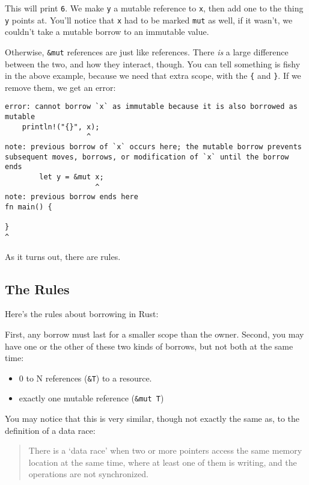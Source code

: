 \documentclass[a4paper,]{book}
\begin{document}
This will print \texttt{6}. We make \texttt{y} a mutable reference to
\texttt{x}, then add one to the thing \texttt{y} points at. You'll
notice that \texttt{x} had to be marked \texttt{mut} as well, if it
wasn't, we couldn't take a mutable borrow to an immutable value.

Otherwise, \texttt{\&mut} references are just like references. There
\emph{is} a large difference between the two, and how they interact,
though. You can tell something is fishy in the above example, because we
need that extra scope, with the \texttt{\{} and \texttt{\}}. If we
remove them, we get an error:

\begin{verbatim}
error: cannot borrow `x` as immutable because it is also borrowed as mutable
    println!("{}", x);
                   ^
note: previous borrow of `x` occurs here; the mutable borrow prevents
subsequent moves, borrows, or modification of `x` until the borrow ends
        let y = &mut x;
                     ^
note: previous borrow ends here
fn main() {

}
^
\end{verbatim}

As it turns out, there are rules.

\subsection{The Rules}\label{the-rules}

Here's the rules about borrowing in Rust:

First, any borrow must last for a smaller scope than the owner. Second,
you may have one or the other of these two kinds of borrows, but not
both at the same time:

\begin{itemize}
\itemsep1pt\parskip0pt
\item
  0 to N references (\texttt{\&T}) to a resource.
\item
  exactly one mutable reference (\texttt{\&mut\ T})
\end{itemize}

You may notice that this is very similar, though not exactly the same
as, to the definition of a data race:

\begin{quote}
There is a `data race' when two or more pointers access the same memory
location at the same time, where at least one of them is writing, and
the operations are not synchronized.
\end{quote}
\end{document}
